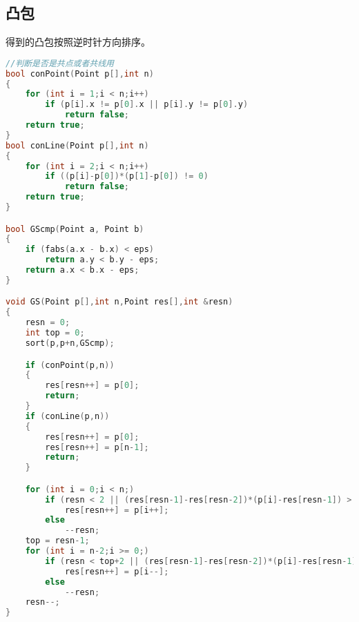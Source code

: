\subsection{凸包}
	得到的凸包按照逆时针方向排序。
	\begin{lstlisting}[language=c++]
//判断是否是共点或者共线用
bool conPoint(Point p[],int n)
{
	for (int i = 1;i < n;i++)
		if (p[i].x != p[0].x || p[i].y != p[0].y)
			return false;
	return true;
}
bool conLine(Point p[],int n)
{
	for (int i = 2;i < n;i++)
		if ((p[i]-p[0])*(p[1]-p[0]) != 0)
			return false;
	return true;
}

bool GScmp(Point a, Point b)
{
	if (fabs(a.x - b.x) < eps)
		return a.y < b.y - eps;
	return a.x < b.x - eps;
}

void GS(Point p[],int n,Point res[],int &resn)
{
	resn = 0;
	int top = 0;
	sort(p,p+n,GScmp);

	if (conPoint(p,n))
	{
		res[resn++] = p[0];
		return;
	}
	if (conLine(p,n))
	{
		res[resn++] = p[0];
		res[resn++] = p[n-1];
		return;
	}

	for (int i = 0;i < n;)
		if (resn < 2 || (res[resn-1]-res[resn-2])*(p[i]-res[resn-1]) > 0)
			res[resn++] = p[i++];
		else
			--resn;
	top = resn-1;
	for (int i = n-2;i >= 0;)
		if (resn < top+2 || (res[resn-1]-res[resn-2])*(p[i]-res[resn-1]) > 0)
			res[resn++] = p[i--];
		else
			--resn;
	resn--;
}
	\end{lstlisting}
	